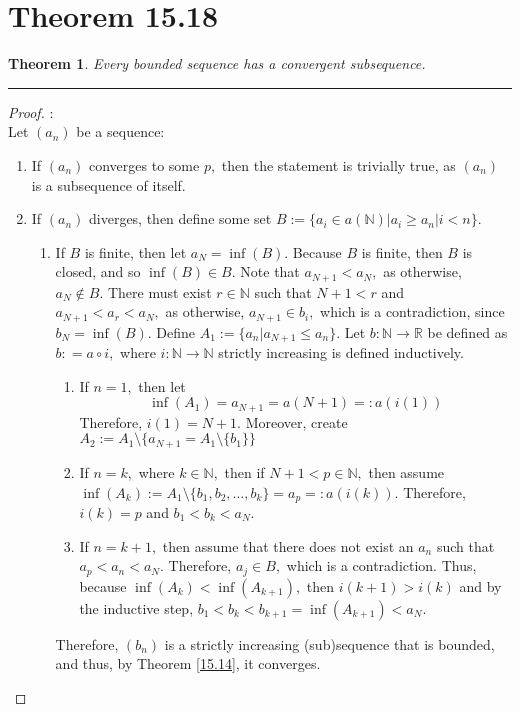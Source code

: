 \documentclass[openany, amssymb, psamsfonts]{amsart}
\newcommand{\bbN}{\mathbb{N}}
\newcommand{\bbR}{\mathbb{R}}
\newtheorem{thm}{Theorem}[section]
\theoremstyle{definition}
\numberwithin{equation}{section}
\begin{document}
\section*{Theorem 15.18}
\begin{thm}
	\label{15.18}
	Every bounded sequence has a convergent subsequence. 
\end{thm}
\vspace{4pt}     \hrule   \vspace{4pt} \begin{proof}:\\
Let $(a_n)$ be a sequence:
\begin{enumerate}
    \item If $(a_n)$ converges to some $p,$ then the statement is trivially true, as $(a_n)$ is a subsequence of itself.
    \item If $(a_n)$ diverges, then define some set $B := \{a_i \in a(\bbN) | a_i\geq a_n | i<n\}.$ 
    \begin{enumerate}
        \item If $B$ is finite, then let $a_N = \inf(B).$ Because $B$ is finite, then $B$ is closed, and so $\inf(B)\in B.$ Note that $a_{N+1}< a_N,$ as otherwise, $a_N\notin B.$ There must exist $r\in \bbN$ such that $N+1 <r$ and $a_{N+1}<a_r<a_N,$ as otherwise, $a_{N+1}\in b_i,$ which is a contradiction, since $b_N = \inf(B).$ Define $A_1 := \{a_n | a_{N+1}\leq a_n\}$. Let $b: \bbN \to \bbR$ be defined as $b: = a \circ i,$ where $i: \bbN \to \bbN$ strictly increasing is defined inductively. 
        \begin{enumerate}
            \item If $n = 1,$ then let \[\inf(A_1) = a_{N+1}= a(N+1) =: a(i(1))\] Therefore, $i(1) = N+1.$ Moreover, create $A_2:=A_1\setminus\{a_{N+1} = A_1\setminus\{b_1\}\}$
            \item If $n = k,$ where $k \in \bbN,$ then if $N+1 < p \in \bbN,$ then assume $\inf(A_k) := A_1\setminus\{b_1, b_2, \dots, b_k\} = a_p=: a(i(k)).$ Therefore, $i(k) = p$ and $b_1< b_k < a_N.$
            \item If $n = k+1,$ then assume that there does not exist an $a_n$ such that $a_p< a_n < a_N.$ Therefore, $a_j \in B,$ which is a contradiction. Thus, because $\inf(A_k)<\inf(A_{k+1}),$ then $i(k+1)> i(k)$ and by the inductive step, $b_1 < b_k <b_{k+1} = \inf(A_{k+1})< a_N.$
        \end{enumerate}
        Therefore, $(b_n)$ is a strictly increasing (sub)sequence that is bounded, and thus, by Theorem \ref{15.14}, it converges.

\end{enumerate}
\end{enumerate}
\end{proof}
\end{document}
